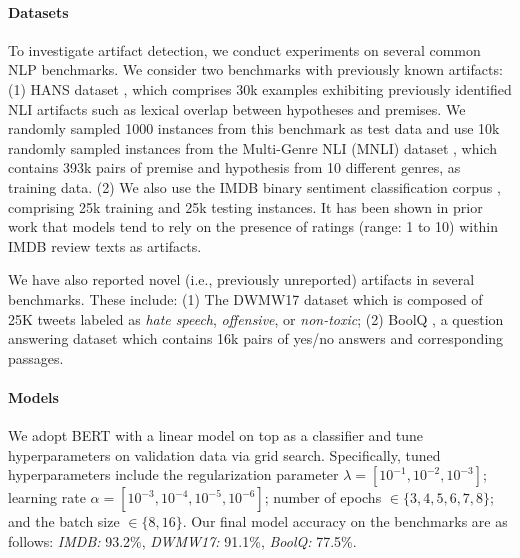 \paragraph{Datasets}
To investigate artifact detection, we conduct experiments on several common NLP benchmarks. 
We consider two benchmarks with previously known artifacts: (1) HANS dataset \citep{mccoy2019right}, which comprises 30k examples exhibiting previously identified NLI artifacts such as lexical overlap between hypotheses and premises. We randomly sampled 1000 instances from this benchmark as test data and use 10k randomly sampled instances from the Multi-Genre NLI (MNLI) dataset \citep{williams2017broad}, which contains 393k pairs of premise and hypothesis from 10 different genres, as training data. (2) We also use the 
IMDB binary sentiment classification corpus \citep{maas2011learning}, comprising 25k training and 25k testing instances. 
It has been shown in prior work \citep{ross2020explaining} that models tend to rely on the presence of ratings (range: 1 to 10) within IMDB review texts as artifacts. 

We have also reported novel (i.e., previously unreported) artifacts in several benchmarks. 
These include: (1) The DWMW17 dataset \citep{davidson2017automated} which is composed of 25K tweets labeled as \emph{hate speech}, \emph{offensive}, or \emph{non-toxic}; 
(2) BoolQ \citep{clark2019boolq}, a question answering dataset which contains 16k pairs of yes/no answers and corresponding passages.

\paragraph{Models} We adopt BERT \citep{devlin2019bert} with a linear model on top as a classifier and tune hyperparameters on validation data via grid search.
Specifically, tuned hyperparameters include the regularization parameter $\lambda=[10^{-1}, 10^{-2}, 10^{-3}]$; learning rate $\alpha=[10^{-3}, 10^{-4}, 10^{-5},10^{-6}]$; number of epochs $\in \{3,4,5,6,7,8\}$; and the batch size $\in \{8, 16\}$. 
Our final model accuracy on the benchmarks are as follows: \textit{IMDB:} 93.2\%, \textit{DWMW17:} 91.1\%, \textit{BoolQ:} 77.5\%. 



